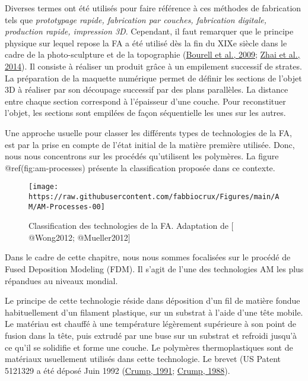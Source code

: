 \documentclass[
]{article}
\begin{document}
Diverses termes ont été utilisés pour faire référence à ces méthodes de
fabrication tels que \emph{prototypage rapide, fabrication par couches,
fabrication digitale, production rapide, impression 3D}. Cependant, il
faut remarquer que le principe physique sur lequel repose la FA a été
utilisé dès la fin du XIXe siècle dans le cadre de la photo-sculpture et
de la topographie (\protect\hyperlink{ref-Bourell2009}{Bourell et al.,
2009}; \protect\hyperlink{ref-Zhai2014}{Zhai et al., 2014}). Il consiste
à réaliser un produit grâce à un empilement successif de strates. La
préparation de la maquette numérique permet de définir les sections de
l'objet 3D à réaliser par son découpage successif par des plans
parallèles. La distance entre chaque section correspond à l'épaisseur
d'une couche. Pour reconstituer l'objet, les sections sont empilées de
façon séquentielle les unes sur les autres.

Une approche usuelle pour classer les différents types de technologies
de la FA, est par la prise en compte de l'état initial de la matière
première utilisée. Donc, nous nous concentrons sur les procédés
qu'utilisent les polymères. La figure @ref(fig:am-processes) présente la
classification proposée dans ce contexte.

\begin{figure}

{\centering \texttt{[image: https://raw.githubusercontent.com/fabbiocrux/Figures/main/AM/AM-Processes-00]} 

}

\caption{Classification des technologies de la FA. Adaptation de [ @Wong2012; @Mueller2012]}\label{fig:am-processes}
\end{figure}

Dans le cadre de cette chapitre, nous nous sommes focalisées sur le
procédé de Fused Deposition Modeling (FDM). Il s'agit de l'une des
technologies AM les plus répandues au niveaux mondial.

Le principe de cette technologie réside dans déposition d'un fil de
matière fondue habituellement d'un filament plastique, sur un substrat à
l'aide d'une tête mobile. Le matériau est chauffé à une température
légèrement supérieure à son point de fusion dans la tête, puis extrudé
par une buse sur un substrat et refroidi jusqu'à ce qu'il se solidifie
et forme une couche. Le polymères thermoplastiques sont de matériaux
usuellement utilisés dans cette technologie. Le brevet (US Patent
5121329 a été déposé Juin 1992 (\protect\hyperlink{ref-Crump1991}{Crump,
1991}; \protect\hyperlink{ref-Crump1988}{Crump, 1988}).
\end{document}
